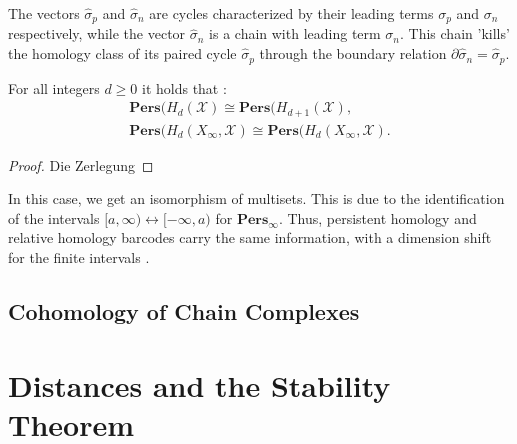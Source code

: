 The vectors $\hat{\sigma}_{p}$ and $\hat{\sigma}_{n}$ are cycles characterized by
their leading terms $\sigma_{p}$ and $\sigma_{n}$ respectively, while the vector
$\hat{\sigma}_{n}$ is a chain with leading term $\sigma_{n}$. This chain 'kills'
the homology class of its paired cycle $\hat{\sigma}_{p}$ through the boundary relation
$\partial \hat{\sigma}_{n} = \hat{\sigma}_{p}$.

\begin{theorem}
	For all integers $d \geq 0$ it holds that \cite[\S 2.4]{de2011dualities}:
	\begin{align*}
		\textbf{Pers}(H_{d}(\mathcal{X}) \cong \textbf{Pers}(H_{d+1}(\mathcal{X}),                       \\
		\textbf{Pers}(H_{d}(X_{\infty}, \mathcal{X}) \cong \textbf{Pers}(H_{d}(X_{\infty}, \mathcal{X}).
	\end{align*}
\end{theorem}

\begin{proof}
	Die Zerlegung
\end{proof}

\begin{remark}
	In this case, we get an isomorphism of multisets. This is due to the identification
	of the intervals $[a,\infty) \leftrightarrow [-\infty, a)$ for $\textbf{Pers}_{\infty}$.
	Thus, persistent homology and relative homology barcodes carry the same information,
	with a dimension shift for the finite intervals \cite[\S 2.4]{de2011dualities}.
\end{remark}

\subsection{Cohomology of Chain Complexes}

\section{Distances and the Stability Theorem}



